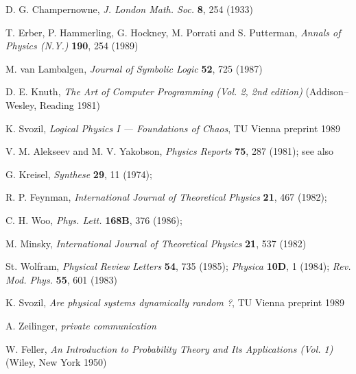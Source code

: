 \begin{thebibliography}{999}
D. G. Champernowne, {\sl J. London Math. Soc.} {\bf 8}, 254 (1933)


 T. Erber, P. Hammerling, G. Hockney, M. Porrati and S. Putterman, {\sl
 Annals of Physics (N.Y.)} {\bf 190}, 254 (1989)

M. van Lambalgen, {\sl Journal of Symbolic Logic} {\bf 52},
725 (1987)

D. E. Knuth, {\sl The Art of Computer Programming (Vol. 2, 2nd edition)}
(Addison--Wesley, Reading 1981)

 K. Svozil, {\sl Logical Physics I --- Foundations of Chaos},
 TU Vienna preprint 1989

V. M. Alekseev and M. V. Yakobson, {\sl Physics Reports}
{\bf 75}, 287 (1981);
see also

G. Kreisel, {\sl Synthese} {\bf 29}, 11 (1974);


R. P. Feynman, {\sl International Journal of Theoretical Physics}
{\bf 21}, 467 (1982);

C. H. Woo, {\sl Phys. Lett.} {\bf 168B}, 376 (1986);

M. Minsky, {\sl International Journal of Theoretical Physics}
{\bf 21}, 537 (1982)

St. Wolfram, {\sl Physical Review Letters} {\bf 54}, 735 (1985);
{\sl Physica} {\bf 10D}, 1 (1984);
{\sl Rev. Mod. Phys.} {\bf 55}, 601 (1983)


 K. Svozil, {\sl Are physical systems dynamically random ?},
 TU Vienna preprint 1989

 A. Zeilinger, {\sl private communication}

W. Feller, {\sl An Introduction to Probability Theory and Its
Applications (Vol. 1)}
(Wiley, New York 1950)


\end{thebibliography}
